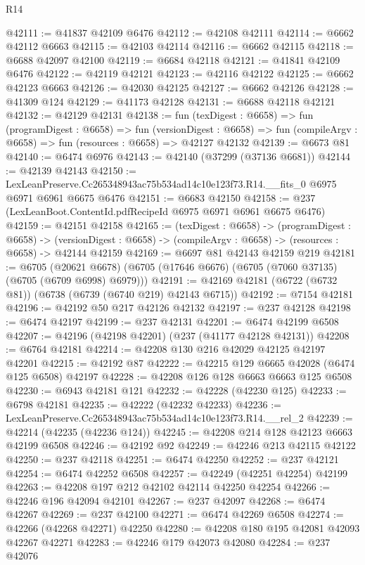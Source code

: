 \begin{lexlean}{R14}
\begin{coremodule}
@42111 := @41837 @42109 @6476
@42112 := @42108 @42111
@42114 := @6662 @42112 @6663
@42115 := @42103 @42114
@42116 := @6662 @42115
@42118 := @6688 @42097 @42100
@42119 := @6684 @42118
@42121 := @41841 @42109 @6476
@42122 := @42119 @42121
@42123 := @42116 @42122
@42125 := @6662 @42123 @6663
@42126 := @42030 @42125
@42127 := @6662 @42126
@42128 := @41309 @124
@42129 := @41173 @42128
@42131 := @6688 @42118 @42121
@42132 := @42129 @42131
@42138 := fun (texDigest : @6658) =>
  fun (programDigest : @6658) =>
  fun (versionDigest : @6658) =>
  fun (compileArgv : @6658) => fun (resources : @6658) => @42127 @42132
@42139 := @6673 @81
@42140 := @6474 @6976
@42143 := @42140 (@37299 (@37136 @6681))
@42144 := @42139 @42143
@42150 := LexLeanPreserve.Cc265348943ac75b534ad14c10e123f73.R14.__fits_0
    @6975
    @6971
    @6961
    @6675
    @6476
@42151 := @6683 @42150
@42158 := @237 (LexLeanBoot.ContentId.pdfRecipeId @6975 @6971 @6961 @6675 @6476)
@42159 := @42151 @42158
@42165 := (texDigest : @6658) ->
  (programDigest : @6658) ->
  (versionDigest : @6658) -> (compileArgv : @6658) -> (resources : @6658) -> @42144 @42159
@42169 := @6697 @81 @42143 @42159 @219
@42181 := @6705
    (@20621 @6678)
    (@6705 (@17646 @6676) (@6705 (@7060 @37135) (@6705 (@6709 @6998) @6979)))
@42191 := @42169 @42181 (@6722 (@6732 @81)) (@6738 (@6739 (@6740 @219) @42143 @6715))
@42192 := @7154 @42181
@42196 := @42192 @50 @217 @42126 @42132
@42197 := @237 @42128
@42198 := @6474 @42197
@42199 := @237 @42131
@42201 := @6474 @42199 @6508
@42207 := @42196 (@42198 @42201) (@237 (@41177 @42128 @42131))
@42208 := @6764 @42181
@42214 := @42208 @130 @216 @42029 @42125 @42197 @42201
@42215 := @42192 @87
@42222 := @42215 @129 @6665 @42028 (@6474 @125 @6508) @42197
@42228 := @42208 @126 @128 @6663 @6663 @125 @6508
@42230 := @6943 @42181 @121
@42232 := @42228 (@42230 @125)
@42233 := @6798 @42181
@42235 := @42222 (@42232 @42233)
@42236 := LexLeanPreserve.Cc265348943ac75b534ad14c10e123f73.R14.__rel_2
@42239 := @42214 (@42235 (@42236 @124))
@42245 := @42208 @214 @128 @42123 @6663 @42199 @6508
@42246 := @42192 @92
@42249 := @42246 @213 @42115 @42122
@42250 := @237 @42118
@42251 := @6474 @42250
@42252 := @237 @42121
@42254 := @6474 @42252 @6508
@42257 := @42249 (@42251 @42254) @42199
@42263 := @42208 @197 @212 @42102 @42114 @42250 @42254
@42266 := @42246 @196 @42094 @42101
@42267 := @237 @42097
@42268 := @6474 @42267
@42269 := @237 @42100
@42271 := @6474 @42269 @6508
@42274 := @42266 (@42268 @42271) @42250
@42280 := @42208 @180 @195 @42081 @42093 @42267 @42271
@42283 := @42246 @179 @42073 @42080
@42284 := @237 @42076

\end{coremodule}
\end{lexlean}
